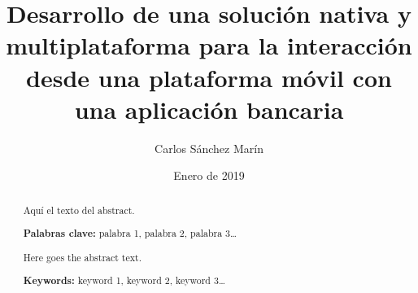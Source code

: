 \documentclass[a4paper, 12pt]{article}
\author{Carlos Sánchez Marín}
\date{Enero de 2019}
\title{Desarrollo de una solución nativa y multiplataforma para la interacción desde una plataforma móvil con una aplicación bancaria}
\begin{document}
\maketitle
\begin{export}
\null
\newpage

\tableofcontents
\newpage

\listoffigures
\listoflistings
\newpage
\end{export}

\begin{abstract}
\normalsize
Aquí el texto del abstract.

\textbf{Palabras clave:} palabra 1, palabra 2, palabra 3\ldots{}
\end{abstract}

\begin{otherlanguage}{english}
\begin{abstract}
\normalsize
Here goes the abstract text.

\textbf{Keywords:} keyword 1, keyword 2, keyword 3\ldots
\end{abstract}
\end{otherlanguage}

\newpage
{}%
\end{document}
